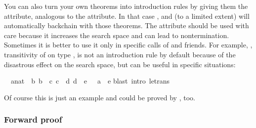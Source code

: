 \begin{isabellebody}
\begin{isamarkuptext}
You can also turn your own theorems into introduction rules by giving them
the  attribute, analogous to the  attribute.  In
that case ,  and (to a limited extent)  will automatically backchain with those theorems. The 
attribute should be used with care because it increases the search space and
can lead to nontermination.  Sometimes it is better to use it only in
specific calls of  and friends. For example,
, transitivity of  on type ,
is not an introduction rule by default because of the disastrous effect
on the search space, but can be useful in specific situations:%
\end{isamarkuptext}%
\isamarkuptrue%
\isamarkupfalse%
\ {}{}\ {}a{}{}nat{}\ {}\ b{}\ b\ {}\ c{}\ c\ {}\ d{}\ d\ {}\ e\ {}\ {}\ a\ {}\ e{}\isanewline
%
\isadelimproof
%
\endisadelimproof
%
\isatagproof
{}\isamarkupfalse%
{}blast\ intro{}\ le{}trans{}%
\endisatagproof
{\isafoldproof}%
%
\isadelimproof
%
\endisadelimproof
%
\begin{isamarkuptext}%
Of course this is just an example and could be proved by , too.

\subsubsection{Forward proof}
\label{sec:forward-proof}


\end{isamarkuptext}
\end{isabellebody}
